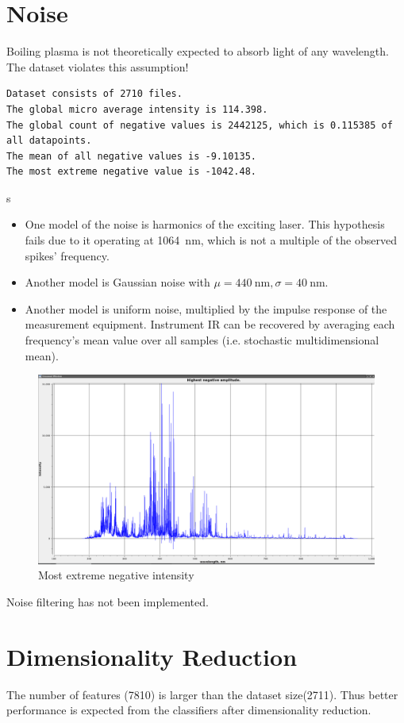 \documentclass{article}
\begin{document}
\section{Noise}
Boiling plasma is not theoretically expected to absorb light of any wavelength.
The dataset violates this assumption!
\par
\begin{verbatim}
Dataset consists of 2710 files.
The global micro average intensity is 114.398.
The global count of negative values is 2442125, which is 0.115385 of all datapoints.
The mean of all negative values is -9.10135.
The most extreme negative value is -1042.48.
\end{verbatim}s
\begin{itemize}
\item{One model of the noise is harmonics of the exciting laser.
This hypothesis fails due to it operating at \SI{1064}{\nano\metre}, which is not a multiple of the observed spikes' frequency.}
\item{Another model is Gaussian noise with $\mu=\SI{440}{\nano\metre}, \sigma=\SI{40}{\nano\metre}$.}
\item{Another model is uniform noise, multiplied by the impulse response of the measurement equipment.
Instrument IR can be recovered by averaging each frequency's mean value over all samples (i.e. stochastic multidimensional mean).}
\end{itemize}
\begin{figure}
\caption{Most extreme negative intensity}
\centering
\includegraphics[width=1.25\textwidth]{img/negatives}
\end{figure}
Noise filtering has not been implemented.


\section{Dimensionality Reduction}
The number of features (7810) is larger than the dataset size(2711).
Thus better performance is expected from the classifiers after dimensionality reduction.
\end{document}
